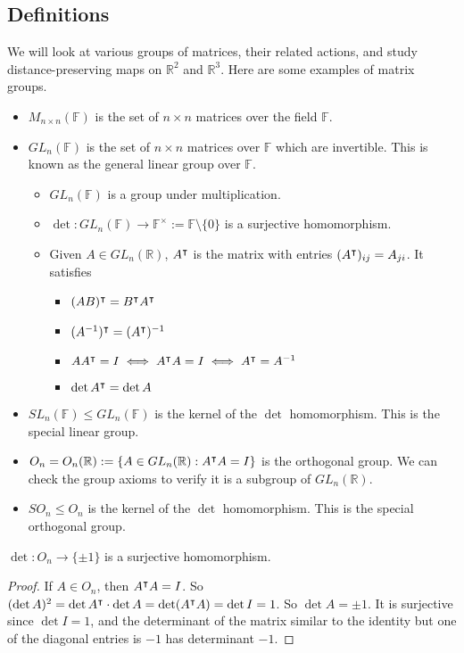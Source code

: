 \subsection{Definitions}
We will look at various groups of matrices, their related actions, and study distance-preserving maps on \(\mathbb R^2\) and \(\mathbb R^3\).
Here are some examples of matrix groups.
\begin{itemize}
	\item \(M_{n \times n}(\mathbb F)\) is the set of \(n \times n\) matrices over the field \(\mathbb F\).
	\item \(GL_n(\mathbb F)\) is the set of \(n \times n\) matrices over \(\mathbb F\) which are invertible.
	      This is known as the general linear group over \(\mathbb F\).
	      \begin{itemize}
		      \item \(GL_n(\mathbb F)\) is a group under multiplication.
		      \item \(\det\colon GL_n(\mathbb F) \to \mathbb F^\times := \mathbb F \setminus \{ 0 \}\) is a surjective homomorphism.
		      \item Given \(A \in GL_n(\mathbb R)\), \(A^\intercal\) is the matrix with entries \((A^\intercal)_{ij} = A_{ji}\).
		            It satisfies
		            \begin{itemize}
			            \item \((AB)^\intercal = B^\intercal A^\intercal\)
			            \item \((A^{-1})^\intercal = (A^\intercal)^{-1}\)
			            \item \(AA^\intercal = I \iff A^\intercal A = I \iff A^\intercal = A^{-1}\)
			            \item \(\det A^\intercal = \det A\)
		            \end{itemize}
	      \end{itemize}
	\item \(SL_n(\mathbb F) \leq GL_n(\mathbb F)\) is the kernel of the \(\det\) homomorphism.
	      This is the special linear group.
	\item \(O_n = O_n(\mathbb R) := \{ A \in GL_n(\mathbb R): A^\intercal A = I \}\) is the orthogonal group.
	      We can check the group axioms to verify it is a subgroup of \(GL_n(\mathbb R)\).
	\item \(SO_n \leq O_n\) is the kernel of the \(\det\) homomorphism.
	      This is the special orthogonal group.
\end{itemize}
\begin{proposition}
	\(\det \colon O_n \to \{ \pm 1 \}\) is a surjective homomorphism.
\end{proposition}
\begin{proof}
	If \(A \in O_n\), then \(A^\intercal A = I\).
	So \((\det A)^2 = \det A^\intercal \cdot \det A = \det(A^\intercal A) = \det I = 1\).
	So \(\det A = \pm 1\).
	It is surjective since \(\det I = 1\), and the determinant of the matrix similar to the identity but one of the diagonal entries is \(-1\) has determinant \(-1\).
\end{proof}

